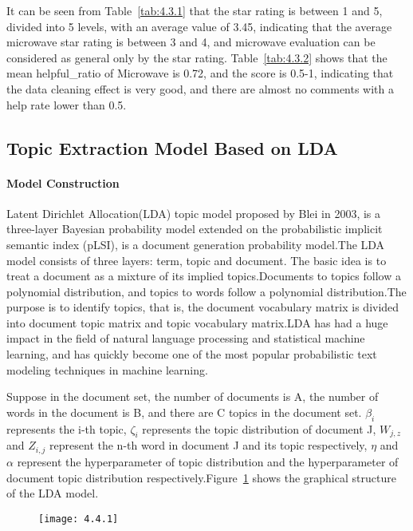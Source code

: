 \documentclass[../mcmpaper]{subfiles}
\begin{document}
    It can be seen from Table~\ref{tab:4.3.1} that the star rating is between 1 and 5, divided into 5 levels, with an average value of 3.45, indicating that the average microwave star rating is between 3 and 4, and microwave evaluation can be considered as general only by the star rating. Table~\ref{tab:4.3.2} shows that the mean helpful\_ratio of Microwave is 0.72, and the score is 0.5-1, indicating that the data cleaning effect is very good, and there are almost no comments with a help rate lower than 0.5.
    \subsection{Topic Extraction Model Based on LDA}
    \paragraph{Model Construction}
    Latent Dirichlet Allocation(LDA)\cite{1} topic model proposed by Blei in 2003, is a three-layer Bayesian probability model extended on the probabilistic implicit semantic index (pLSI), is a document generation probability model.The LDA model consists of three layers: term, topic and document. The basic idea is to treat a document as a mixture of its implied topics.Documents to topics follow a polynomial distribution, and topics to words follow a polynomial distribution.The purpose is to identify topics, that is, the document vocabulary matrix is divided into document topic matrix and topic vocabulary matrix.LDA\cite{2} has had a huge impact in the field of natural language processing and statistical machine learning, and has quickly become one of the most popular probabilistic text modeling techniques in machine learning.
    \par
    Suppose in the document set, the number of documents is A, the number of words in the document is B, and there are C topics in the document set. $\beta_i$ represents the i-th topic, $\zeta_i$ represents the topic distribution of document J, $W_{j,z}$ and $Z_{i, j}$ represent the n-th word in document J and its topic respectively, $\eta$ and $\alpha$ represent the hyperparameter of topic distribution and the hyperparameter of document topic distribution respectively.Figure~\ref{fig:4.4.1} shows the graphical structure of the LDA model.
    \begin{figure}[!ht]
    \centering
    \texttt{[image: 4.4.1]}
    \label{fig:4.4.1}
    \end{figure}
\end{document}
